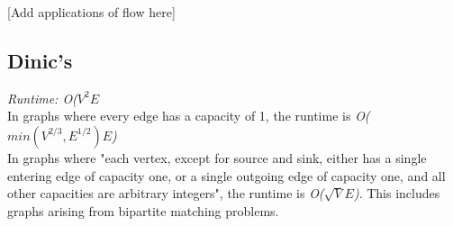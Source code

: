 
[Add applications of flow here]

\subsection*{Dinic's}

\textit{Runtime: O($V^2 E$} \\
\indent In graphs where every edge has a capacity of 1, the runtime is \textit{O($min(V^{2/3}, E^{1/2}) E$)} \\
\indent In graphs where "each vertex, except for source and sink, either has a single entering edge of capacity one, or a single outgoing edge of capacity one, and all other capacities are arbitrary integers", the runtime is \textit{O($\sqrt{V} E$)}. This includes graphs arising from bipartite matching problems.



\newpage